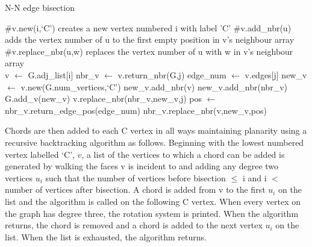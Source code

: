 \documentclass[12pt]{article}
\begin{document}
\begin{algorithm} [H]
\caption{N-N edge bisection}\label{euclid}
\begin{algorithmic}[1]
\scriptsize
{}
    \State \#v.new(i,`C') creates a new vertex numbered i with label 'C'
    \State \#v.add\_nbr(u) adds the vertex number of u to the first empty position in v's neighbour array
    \State \#v.replace\_nbr(u,w) replaces the vertex number of u with w in v's neighbour array \\
        \State v $\gets$ G.adj\_list[i]
            \State nbr\_v $\gets$ v.return\_nbr(G,j)
                \State edge\_num $\gets$ v.edges[j]
                \State new\_v $\gets$ v.new(G.num\_vertices,`C')
                \State new\_v.add\_nbr(v)
                \State new\_v.add\_nbr(nbr\_v)
                \State G.add\_v(new\_v)
                \State v.replace\_nbr(nbr\_v,new\_v,j)
                \State pos $\gets$ nbr\_v.return\_edge\_pos(edge\_num)
                \State nbr\_v.replace\_nbr(v,new\_v,pos)
            \EndIf
        \EndFor
    \EndFor
\EndProcedure

\end{algorithmic}
\end{algorithm}

Chords are then added to each C vertex in all ways maintaining planarity using a recursive backtracking algorithm as follows. Beginning with the lowest numbered vertex labelled `C', $v$, a list of the vertices to which a chord can be added is generated by walking the faces v is incident to and adding any degree two vertices $u_i$ such that the number of vertices before bisection $\leq$ i and i $<$ number of vertices after bisection. A chord is added from v to the first $u_i$ on the list and the algorithm is called on the following C vertex. When every vertex on the graph has degree three, the rotation system is printed. When the algorithm returns, the chord is removed and a chord is added to the next vertex $u_i$ on the list. When the list is exhausted, the algorithm returns.
\end{document}
